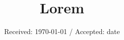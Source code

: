 \documentclass{article}
\title{Lorem}
\begin{document}
\date{Received: \today{} / Accepted: date}
\maketitle
\gdef\SatexReachedEnd{}
\end{document}
